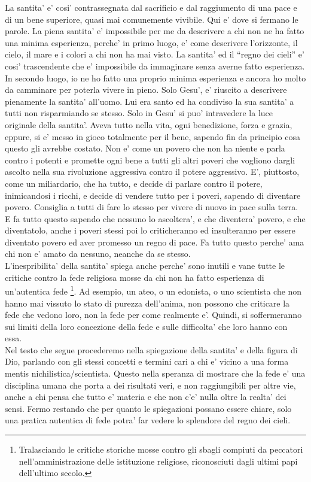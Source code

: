 La santita' e' cosi' contrassegnata dal sacrificio e dal raggiumento di una pace e di un bene superiore, quasi mai comunemente vivibile. Qui e' dove si fermano le parole. La piena santita' e' impossibile per me da descrivere a chi non ne ha fatto una minima esperienza, perche' in primo luogo, e' come descrivere l'orizzonte, il cielo, il mare e i colori a chi non ha mai visto. La santita' ed il ``regno dei cieli'' e' cosi' trascendente che e' impossibile da immaginare senza averne fatto esperienza. In secondo luogo, io ne ho fatto una proprio minima esperienza e ancora ho molto da camminare per poterla vivere in pieno. Solo Gesu', e' riuscito a descrivere pienamente la santita' all'uomo. Lui era santo ed ha condiviso la sua santita' a tutti non risparmiando se stesso. Solo in Gesu' si puo' intravedere la luce originale della santita'. Aveva tutto nella vita, ogni benedizione, forza e grazia, eppure, si e' messo in gioco totalmente per il bene, sapendo fin da principio cosa questo gli avrebbe costato. Non e' come un povero che non ha niente e parla contro i potenti e promette ogni bene a tutti gli altri poveri che vogliono dargli ascolto nella sua rivoluzione aggressiva contro il potere aggressivo. E', piuttosto, come un miliardario, che ha tutto, e decide di parlare contro il potere, inimicandosi i ricchi, e decide di vendere tutto per i poveri, sapendo di diventare povero. Consiglia a tutti di fare lo stesso per vivere di nuovo in pace sulla terra. E fa tutto questo sapendo che nessuno lo ascoltera', e che diventera' povero, e che diventatolo, anche i poveri stessi poi lo criticheranno ed insulteranno per essere diventato povero ed aver promesso un regno di pace. Fa tutto questo perche' ama chi non e' amato da nessuno, neanche da se stesso.\\
L'inespribilita' della santita' spiega anche perche' sono inutili e vane tutte le critiche contro la fede religiosa mosse da chi non ha fatto esperienza di un'autentica fede \footnote{Tralasciando le critiche storiche mosse contro gli sbagli compiuti da peccatori nell'amministrazione delle istituzione religiose, riconosciuti dagli ultimi papi dell'ultimo secolo.}. Ad esempio, un ateo, o un edonista, o uno scientista che non hanno mai vissuto lo stato di purezza dell'anima, non possono che criticare la fede che vedono loro, non la fede per come realmente e'. Quindi, si soffermeranno sui limiti della loro concezione della fede e sulle difficolta' che loro hanno con essa.\\
Nel testo che segue procederemo nella spiegazione della santita' e della figura di Dio, parlando con gli stessi concetti e termini cari a chi e' vicino a una forma mentis nichilistica/scientista. Questo nella speranza di mostrare che la fede e' una disciplina umana che porta a dei risultati veri, e non raggiungibili per altre vie, anche a chi pensa che tutto e' materia e che non c'e' nulla oltre la realta' dei sensi. Fermo restando che per quanto le spiegazioni possano essere chiare, solo una pratica autentica di fede potra' far vedere lo splendore del regno dei cieli.

